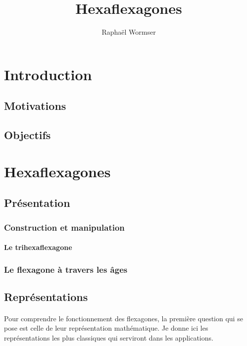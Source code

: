 \documentclass[10pt,a4paper]{article}
\author{Raphaël Wormser}
\title{Hexaflexagones}
\begin{document}
\maketitle
\tableofcontents



\section{Introduction}\label{intro}
	\subsection{Motivations}\label{motiv}
	\subsection{Objectifs}\label{objtf}



\section{Hexaflexagones}\label{hexa-1}


	\subsection{Présentation}\label{hexa-pres}
	
		\subsubsection{Construction et manipulation}\label{constr-1}
			\paragraph{Le trihexaflexagone}

		\subsubsection{Le flexagone à travers les âges}\label{hexa-histo}


	\subsection{Représentations}\label{hexa-repr}
		\paragraph{}Pour comprendre le fonctionnement des flexagones, la première question qui se pose est celle de leur représentation mathématique. Je donne ici les représentations les plus classiques qui serviront dans les applications.
		
\end{document}
